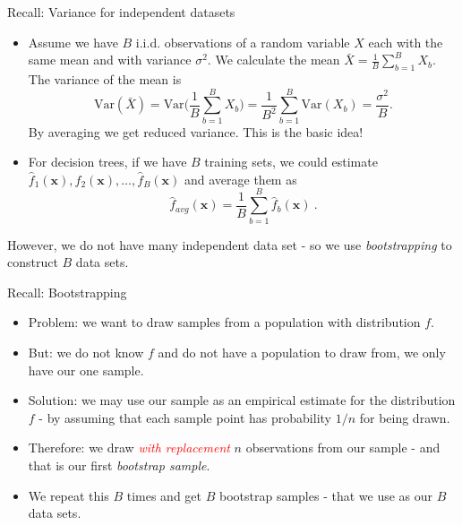 \documentclass[10pt,ignorenonframetext,]{beamer}
\begin{document}
\begin{frame}

\begin{block}{Recall: Variance for independent datasets}

\vspace{2mm}

\begin{itemize}
\item
  Assume we have \(B\) i.i.d. observations of a random variable \(X\)
  each with the same mean and with variance \(\sigma^2\). We calculate
  the mean \(\bar{X} = \frac{1}{B} \sum_{b=1}^B X_b\). The variance of
  the mean is
  \[\text{Var}(\bar{X}) = \text{Var}\Big(\frac{1}{B}\sum_{b=1}^B X_b \Big) = \frac{1}{B^2} \sum_{b=1}^B \text{Var}(X_b) = \frac{\sigma^2}{B}.\]
  By averaging we get reduced variance. This is the basic idea!
\item
  For decision trees, if we have \(B\) training sets, we could estimate
  \(\hat{f}_1({\boldsymbol x}),\hat{f}_2({\boldsymbol x}),\ldots, \hat{f}_B({\boldsymbol x})\)
  and average them as
  \[ \hat{f}_{avg}({\boldsymbol x})=\frac{1}{B}\sum_{b=1}^B \hat{f}_b({\boldsymbol x}) \ .\]
\end{itemize}

However, we do not have many independent data set - so we use
\emph{bootstrapping} to construct \(B\) data sets.

\end{block}

\end{frame}

\begin{frame}

\begin{block}{Recall: Bootstrapping}

\vspace{2mm}

\begin{itemize}
\item
  Problem: we want to draw samples from a population with distribution
  \(f\).
\item
  But: we do not know \(f\) and do not have a population to draw from,
  we only have our one sample.
\item
  Solution: we may use our sample as an empirical estimate for the
  distribution \(f\) - by assuming that each sample point has
  probability \(1/n\) for being drawn.
\item
  Therefore: we draw \emph{\textcolor{red}{with replacement}} \(n\)
  observations from our sample - and that is our first \emph{bootstrap
  sample}.
\item
  We repeat this \(B\) times and get \(B\) bootstrap samples - that we
  use as our \(B\) data sets.
\end{itemize}

\end{block}

\end{frame}
\end{document}
